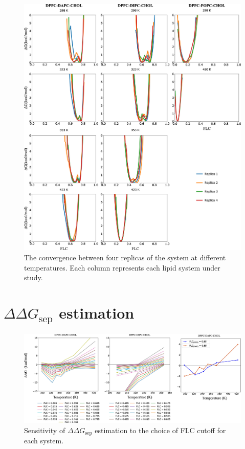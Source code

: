 \documentclass[10pt]{article}
\let\oldsection\section
\renewcommand{\section}{\clearpage\oldsection}
\begin{document}
\begin{figure}[H]
    \centering
    \includegraphics[width=6.5in]{Figures/Supplementary/ReplicaConvergence/placeholder.jpg}
    \caption{The convergence between four replicas of the system at different temperatures. Each column represents each lipid system under study.}
    \label{figs7:view}
\end{figure}

\section{$\Delta\Delta G_\text{sep}$ estimation}

\begin{figure}[H]
    \centering
    \includegraphics[width=6.5in]{Figures/Supplementary/InterpretingDelDelG/placeholder.jpg}
    \caption{Sensitivity of $\Delta\Delta G_\text{sep}$ estimation to the choice of FLC cutoff for each system. }
    \label{figs8:view}
\end{figure}



\end{document}
